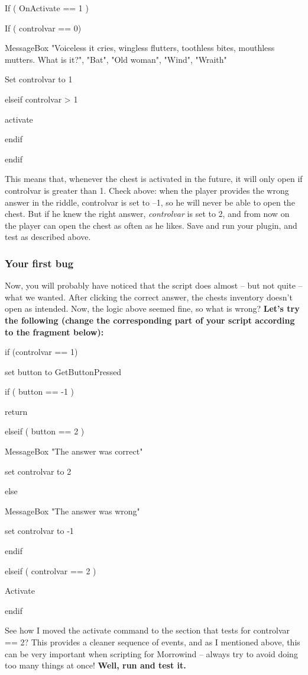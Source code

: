 \documentclass[
]{article}
\begin{document}
If ( OnActivate == 1 )

If ( controlvar == 0)

MessageBox "Voiceless it cries, wingless flutters, toothless bites,
mouthless mutters. What is it?", "Bat", "Old woman", "Wind", "Wraith"

Set controlvar to 1

elseif controlvar \textgreater{} 1

activate

endif

endif

This means that, whenever the chest is activated in the future, it will
only open if controlvar is greater than 1. Check above: when the player
provides the wrong answer in the riddle, controlvar is set to --1, so he
will never be able to open the chest. But if he knew the right answer,
\emph{controlvar} is set to 2, and from now on the player can open the
chest as often as he likes. Save and run your plugin, and test as
described above.

\hypertarget{your-first-bug}{%
\subsubsection{Your first bug}\label{your-first-bug}}

Now, you will probably have noticed that the script does almost -- but
not quite -- what we wanted. After clicking the correct answer, the
chests inventory doesn't open as intended. Now, the logic above seemed
fine, so what is wrong? \textbf{Let's try the following (change the
corresponding part of your script according to the fragment below):}

if (controlvar == 1)

set button to GetButtonPressed

if ( button == -1 )

return

elseif ( button == 2 )

MessageBox "The answer was correct"

set controlvar to 2

else

MessageBox "The answer was wrong"

set controlvar to -1

endif

elseif ( controlvar == 2 )

Activate

endif

See how I moved the activate command to the section that tests for
controlvar == 2? This provides a cleaner sequence of events, and as I
mentioned above, this can be very important when scripting for Morrowind
-- always try to avoid doing too many things at once! \textbf{Well, run
and test it.}
\end{document}
